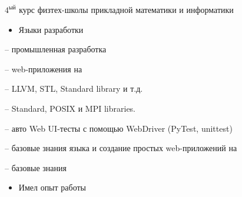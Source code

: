 \documentclass[10pt,a4paper,ragged2e,withhyper]{custom-altacv}
\begin{document}
\begin{paracol}{2}


\fi



\switchcolumn


$4^\text{ый}$ курс физтех-школы прикладной математики и информатики




\begin{itemize}
	\item \textcolor{emphasis}{Языки разработки}
\end{itemize}

 -- промышленная разработка
\vspace{1ex}

 -- web-приложения на 
\vspace{1ex}

 -- LLVM, STL, Standard library и т.д.
\vspace{1ex}

 -- Standard, POSIX и MPI libraries.
\vspace{1ex}

 -- авто Web UI-тесты с помощью WebDriver (PyTest, unittest)
\vspace{1ex}

 -- базовые знания языка и создание простых web-приложений на 

 -- базовые знания
\vspace{.5ex}

\divider

\begin{itemize}
	\item \textcolor{emphasis}{Имел опыт работы}
\end{itemize}


\end{paracol}
\end{document}
